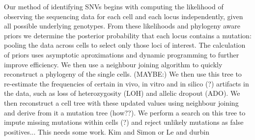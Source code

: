 \documentclass[../../main.tex]{subfiles}
\begin{document}
Our method of identifying SNVs begins with computing the likelihood of observing the sequencing data for each cell and each locus independently, given all possible underlying genotypes. From these likelihoods and phylogeny aware priors we determine the posterior probability that each locus contains a mutation: pooling the data across cells to select only those loci of interest. The calculation of priors uses asymptotic aproximations and dynamic programming to further improve efficiency. We then use a neighbour joining algorithm to quickly reconstruct a phylogeny of the single cells. (MAYBE:) We then use this tree to re-estimate the frequencies of certain in vivo, in vitro and in silico (?) artifacts in the data, such as loss of heterozygosity (LOH) and allelic dropout (ADO). We then reconstruct a cell tree with these updated values using neighbour joining and derive from it a mutation tree (how??). We perform a search on this tree to impute missing mutations within cells (?) and reject unlikely mutations as false positives... This needs some work. Kim and Simon or Le and durbin
\end{document}
